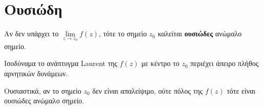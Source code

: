 \section*{Ουσιώδη}

\begin{dfn}
  Αν δεν υπάρχει το $\lim\limits_{z\to z_0}f(z)$, τότε το σημείο $z_0$ καλείται 
  \textbf{ουσιώδες} ανώμαλο σημείο. 

  \begin{myitemize}
    \item Ισοδύναμα το ανάπτυγμα Laurent της $f(z)$ \textcolor{Col2}{με κέντρο το $z_0$} 
      περιέχει άπειρο πλήθος αρνητικών δυνάμεων.
  \end{myitemize}
\end{dfn}

\begin{rem}
  Ουσιαστικά, αν το σημείο $z_0$ δεν είναι απαλείψιμο, ούτε πόλος της 
  $f(z)$ τότε είναι ουσιώδες ανώμαλο σημείο.
\end{rem}




